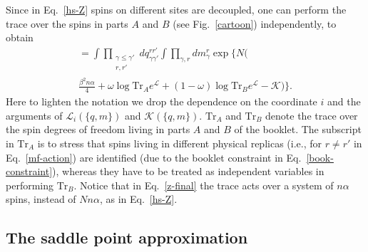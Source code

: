 \documentclass[twocolumn,superscriptaddress,prb,10pt]{revtex4-1}
\def\tr{\textrm{Tr}}
\begin{document}
Since in Eq.~\eqref{hs-Z} spins on  different sites are decoupled, one can 
perform the trace over the spins in parts $A$ and $B$ (see Fig.~\ref{cartoon}) 
independently, to obtain 
%
\begin{multline}
[Z^\alpha(\omega,n,\beta)]=
\int\prod_{\substack{\gamma\le\gamma'\\r,r'}}
dq^{rr'}_{\gamma\gamma'}
\int\prod_{\gamma,r}dm_\gamma^r
\exp\Big\{N\Big(\\
\frac{\beta^2n\alpha}{4}+\omega\log\tr_Ae^{{\mathcal L}}+
(1-\omega)\log\tr_Be^{{\mathcal L}}-{\mathcal K}\Big)\Big\}.
\label{z-final}
\end{multline}
%
Here to lighten the notation we drop the dependence on the coordinate $i$ 
and the arguments of ${\mathcal L}_i(\{q,m\})$ and ${\mathcal K}(\{q,m\})$. 
$\textrm{Tr}_{A}$ and $\textrm{Tr}_{B}$  denote the trace over the spin degrees 
of freedom living in parts $A$ and $B$ of the booklet.
The subscript in $\tr_A$ is to stress that spins living in different physical 
replicas (i.e., for $r\ne r'$ in Eq.~\eqref{mf-action}) are identified (due 
to the booklet constraint in Eq.~\eqref{book-constraint}), whereas they have 
to be treated as independent variables in performing $\tr_B$.  
Notice that in Eq.~\eqref{z-final} the trace acts over a system of $n\alpha$ 
spins, instead of $Nn\alpha$, as in Eq.~\eqref{hs-Z}. 

\subsection{The saddle point approximation}
\label{saddle-point}
\end{document}
